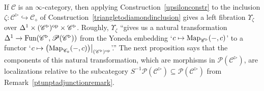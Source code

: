 \documentclass{tac}
\newcommand{\s}[1]{\mathscr{#1}}
\newcommand{\tx}[1]{\textnormal{#1}}
\begin{document}
If $\s{C}$ is an $\infty$-category, then applying Construction~\ref{upsilonconstr} to the inclusion $\zeta : \s{C}^{\triangleright} \hookrightarrow \s{C}_\diamond$ of Construction~\ref{triangletodiamondinclusion} gives a left fibration $\Upsilon_\zeta$ over $\Delta^1 \times (\s{C}^\triangleright )^\tx{op} \times \s{C}^\triangleright$.  Roughly, $\Upsilon_\zeta$ ``gives us a natural transformation $\Delta^1 \to \tx{Fun}( \s{C}^\triangleright, \s{P}(\s{C}^\triangleright ) )$ from the Yoneda embedding `$c \mapsto \tx{Map}_{\s{C}^\triangleright} (-,c)$' to a functor `$c \mapsto  \big( \tx{Map}_{\s{C}_\diamond} (-,c) \big) \big|_{ (\s{C}^\triangleright )^\tx{op}}$'.''  The next proposition says that the components of this natural transformation, which are morphisms in $\s{P}(\s{C}^\triangleright ) $, are localizations relative to the subcategory $S^{-1} \s{P}(\s{C}^\triangleright )  \subseteq \s{P}(\s{C}^\triangleright ) $ from Remark~\ref{ptunptadjunctionremark}.  
\end{document}
